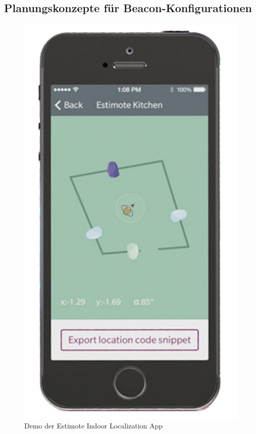 \subsection{Planungskonzepte für Beacon-Konfigurationen}
\begin{figure}
\centering
\includegraphics[scale=0.23]{Bilder/TrackEstimote}
\caption{Demo der Estimote Indoor Localization App \cite{TrEs}}
\label{fig:EstiPlan}
\end{figure}
